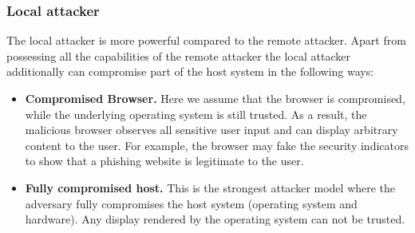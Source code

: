 \subsubsection{Local attacker}

The local attacker is more powerful compared to the remote attacker. Apart from
possessing all the capabilities of the remote attacker the local attacker
additionally can compromise part of the host system in the following ways:

\begin{itemize}
  \item \textbf{Compromised Browser.}
Here we assume that the browser is compromised, while the underlying operating
system is still trusted. As a result, the malicious browser observes all
sensitive user input and can display arbitrary content to the user. For example,
the browser may fake the security indicators to show that a phishing website is
legitimate to the user.

\item \textbf{Fully compromised host.}
This is the strongest attacker model where the adversary fully compromises the
host system (operating system and hardware). Any display rendered by the
operating system can not be trusted.
\end{itemize}

